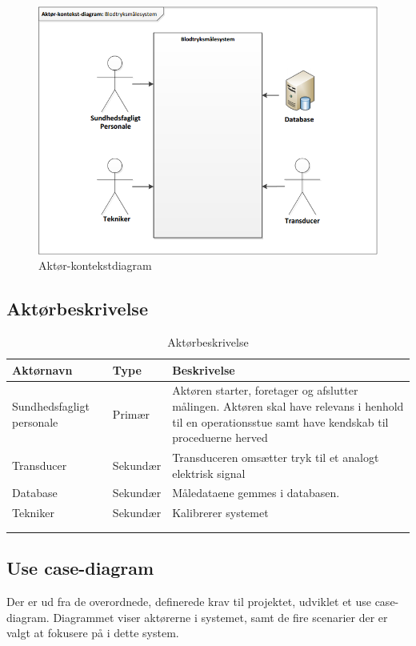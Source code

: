 \begin{figure}[H]
\centering
\includegraphics[scale=0.70]{ak.PNG}
\caption{Aktør-kontekstdiagram}
\end{figure}

\newpage

\subsection{Aktørbeskrivelse}

\begin{longtabu} to 
    \textbf{Aktørnavn} &        \textbf{Type} &    \textbf{Beskrivelse}\\[-1ex]
    \midrule
    Sundhedsfagligt personale &    Primær &    Aktøren starter, foretager og afslutter målingen. Aktøren skal have relevans i henhold til en operationsstue samt have kendskab til proceduerne herved\\
    Transducer &        Sekundær &    Transduceren omsætter tryk til et analogt elektrisk signal\\
    Database &        Sekundær &    Måledataene gemmes i databasen.\\
    Tekniker &       Sekundær &    Kalibrerer systemet\\
    
\caption{Aktørbeskrivelse}\\
\label{actortable}
\end{longtabu}


\subsection{Use case-diagram}
Der er ud fra de overordnede, definerede krav til projektet, udviklet et use case-diagram. Diagrammet viser aktørerne i systemet, samt de fire scenarier der er valgt at fokusere på i dette system. 

